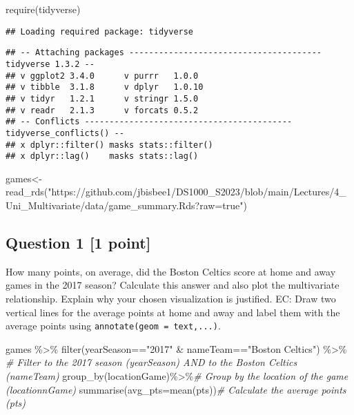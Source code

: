 \documentclass[
]{article}
\newenvironment{Shaded}{\begin{snugshade}}{\end{snugshade}}
\newcommand{\AttributeTok}[1]{\textcolor[rgb]{0.77,0.63,0.00}{#1}}
\newcommand{\CommentTok}[1]{\textcolor[rgb]{0.56,0.35,0.01}{\textit{#1}}}
\newcommand{\FunctionTok}[1]{\textcolor[rgb]{0.00,0.00,0.00}{#1}}
\newcommand{\NormalTok}[1]{#1}
\newcommand{\OtherTok}[1]{\textcolor[rgb]{0.56,0.35,0.01}{#1}}
\newcommand{\SpecialCharTok}[1]{\textcolor[rgb]{0.00,0.00,0.00}{#1}}
\newcommand{\StringTok}[1]{\textcolor[rgb]{0.31,0.60,0.02}{#1}}
\begin{document}
\begin{Shaded}
\begin{Highlighting}[]
\FunctionTok{require}\NormalTok{(tidyverse)}
\end{Highlighting}
\end{Shaded}

\begin{verbatim}
## Loading required package: tidyverse
\end{verbatim}

\begin{verbatim}
## -- Attaching packages --------------------------------------- tidyverse 1.3.2 --
## v ggplot2 3.4.0      v purrr   1.0.0 
## v tibble  3.1.8      v dplyr   1.0.10
## v tidyr   1.2.1      v stringr 1.5.0 
## v readr   2.1.3      v forcats 0.5.2 
## -- Conflicts ------------------------------------------ tidyverse_conflicts() --
## x dplyr::filter() masks stats::filter()
## x dplyr::lag()    masks stats::lag()
\end{verbatim}

\begin{Shaded}
\begin{Highlighting}[]
\NormalTok{games}\OtherTok{\textless{}{-}}\FunctionTok{read\_rds}\NormalTok{(}\StringTok{"https://github.com/jbisbee1/DS1000\_S2023/blob/main/Lectures/4\_Uni\_Multivariate/data/game\_summary.Rds?raw=true"}\NormalTok{)}
\end{Highlighting}
\end{Shaded}

\hypertarget{question-1-1-point}{%
\subsection{Question 1 {[}1 point{]}}\label{question-1-1-point}}

How many points, on average, did the Boston Celtics score at home and
away games in the 2017 season? Calculate this answer and also plot the
multivariate relationship. Explain why your chosen visualization is
justified. EC: Draw two vertical lines for the average points at home
and away and label them with the average points using
\texttt{annotate(geom\ =\ \textquotesingle{}text\textquotesingle{},...)}.

\begin{Shaded}
\begin{Highlighting}[]
\NormalTok{games }\SpecialCharTok{\%\textgreater{}\%}
  \FunctionTok{filter}\NormalTok{(yearSeason}\SpecialCharTok{==}\StringTok{"2017"} \SpecialCharTok{\&}\NormalTok{ nameTeam}\SpecialCharTok{==}\StringTok{"Boston Celtics"}\NormalTok{) }\SpecialCharTok{\%\textgreater{}\%} \CommentTok{\# Filter to the 2017 season (yearSeason) AND to the Boston Celtics (nameTeam)}
  \FunctionTok{group\_by}\NormalTok{(locationGame)}\SpecialCharTok{\%\textgreater{}\%}\CommentTok{\# Group by the location of the game (locationnGame)}
  \FunctionTok{summarise}\NormalTok{(}\AttributeTok{avg\_pts=}\FunctionTok{mean}\NormalTok{(pts))}\CommentTok{\# Calculate the average points (pts)}
\end{Highlighting}
\end{Shaded}
\end{document}
